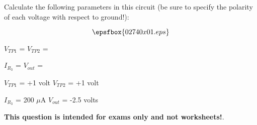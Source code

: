 

Calculate the following parameters in this circuit (be sure to specify the polarity of each voltage with respect to ground!):

$$\epsfbox{02740x01.eps}$$

$V_{TP1}$ = \hskip 80pt $V_{TP2}$ =

\vskip 10pt

$I_{R_3}$ = \hskip 80pt $V_{out}$ =







$V_{TP1}$ = +1 volt \hskip 50pt $V_{TP2}$ = +1 volt

\vskip 10pt

$I_{R_3}$ = 200 $\mu$A \hskip 50pt $V_{out}$ = -2.5 volts







{\bf This question is intended for exams only and not worksheets!}.




